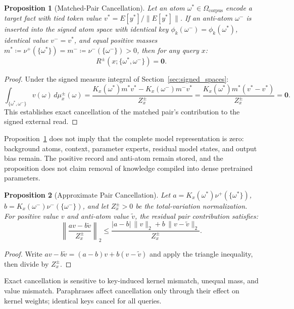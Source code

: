 \documentclass[preprint,12pt]{elsarticle}
\newtheorem{proposition}{Proposition}
\newcommand{\Om}{\Omega}
\begin{document}
\begin{proposition}[Matched-Pair Cancellation]
\label{prop:unlearning}
Let an atom $\omega^* \in \Om_{\mathrm{corpus}}$ encode a target fact with tied token value $v^* = E[y^*] / \|E[y^*]\|$. If an anti-atom $\omega^-$ is inserted into the signed atom space with identical key $\phi_k(\omega^-) = \phi_k(\omega^*)$, identical value $v^- = v^*$, and equal positive masses $m^* \coloneqq \nu^+(\{\omega^*\}) = m^- \coloneqq \nu^-(\{\omega^-\}) > 0$, then for any query $x$:
\[
  R^{\pm}(x; \{\omega^*, \omega^-\}) = \mathbf{0}.
\]
\end{proposition}

\begin{proof}
Under the signed measure integral of Section~\ref{sec:signed_spaces}:
\[
  \int_{\{\omega^*, \omega^-\}} v(\omega)\, d\mu_x^{\pm}(\omega) = \frac{K_x(\omega^*) m^* v^* - K_x(\omega^-) m^- v^*}{Z_x^{\pm}} = \frac{K_x(\omega^*) m^* (v^* - v^*)}{Z_x^{\pm}} = \mathbf{0}.
\]
This establishes exact cancellation of the matched pair's contribution to the signed external read. \qedhere
\end{proof}

Proposition~\ref{prop:unlearning} does not imply that the complete model representation is zero: background atoms, context, parameter experts, residual model states, and output bias remain. The positive record and anti-atom remain stored, and the proposition does not claim removal of knowledge compiled into dense pretrained parameters.

\begin{proposition}[Approximate Pair Cancellation]
\label{prop:approximate_cancellation}
Let $a=K_x(\omega^*)\nu^+(\{\omega^*\})$, $b=K_x(\omega^-)\nu^-(\{\omega^-\})$, and let $Z_x^{\pm}>0$ be the total-variation normalization. For positive value $v$ and anti-atom value $\tilde v$, the residual pair contribution satisfies:
\[
  \left\|\frac{a v-b\tilde v}{Z_x^{\pm}}\right\|_2
  \le \frac{|a-b|\,\|v\|_2+b\,\|v-\tilde v\|_2}{Z_x^{\pm}}.
\]
\end{proposition}

\begin{proof}
Write $a v-b\tilde v=(a-b)v+b(v-\tilde v)$ and apply the triangle inequality, then divide by $Z_x^{\pm}$. \qedhere
\end{proof}

Exact cancellation is sensitive to key-induced kernel mismatch, unequal mass, and value mismatch. Paraphrases affect cancellation only through their effect on kernel weights; identical keys cancel for all queries.
\end{document}
